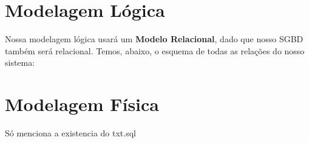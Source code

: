 \documentclass{article}
\begin{document}
\section{Modelagem Lógica}
	Nossa modelagem lógica usará um \textbf{Modelo Relacional}, dado que nosso SGBD também será relacional. Temos, abaixo, o esquema de todas as relações do nosso sistema:\\


\section{Modelagem Física}
	Só menciona a existencia do txt.sql
\end{document}
